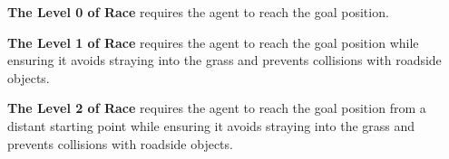\documentclass{article}
\begin{document}


\textbf{The Level 0 of Race} requires the agent to reach the goal position.

\textbf{The Level 1 of Race} requires the agent to reach the goal position while ensuring it avoids straying into the grass and prevents collisions with roadside objects.

\textbf{The Level 2 of Race} requires the agent to reach the goal position from a distant starting point while ensuring it avoids straying into the grass and prevents collisions with roadside objects.
\end{document}
